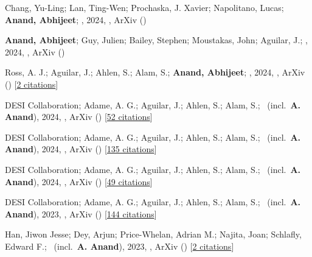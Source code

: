 \item[{\color{numcolor}\scriptsize8}] Chang, Yu-Ling; Lan, Ting-Wen; Prochaska, J. Xavier; Napolitano, Lucas; \textbf{Anand, Abhijeet}; \etal, 2024, , ArXiv ()

\item[{\color{numcolor}\scriptsize7}] \textbf{Anand, Abhijeet}; Guy, Julien; Bailey, Stephen; Moustakas, John; Aguilar, J.; \etal, 2024, , ArXiv ()

\item[{\color{numcolor}\scriptsize6}] Ross, A. J.; Aguilar, J.; Ahlen, S.; Alam, S.; \textbf{Anand, Abhijeet}; \etal, 2024, , ArXiv () [\href{https://ui.adsabs.harvard.edu/abs/2024arXiv240516593R}{2 citations}]

\item[{\color{numcolor}\scriptsize5}] DESI Collaboration; Adame, A. G.; Aguilar, J.; Ahlen, S.; Alam, S.; \etal\ (incl.\ \textbf{A. Anand}), 2024, , ArXiv () [\href{https://ui.adsabs.harvard.edu/abs/2024arXiv240403000D}{52 citations}]

\item[{\color{numcolor}\scriptsize4}] DESI Collaboration; Adame, A. G.; Aguilar, J.; Ahlen, S.; Alam, S.; \etal\ (incl.\ \textbf{A. Anand}), 2024, , ArXiv () [\href{https://ui.adsabs.harvard.edu/abs/2024arXiv240403002D}{135 citations}]

\item[{\color{numcolor}\scriptsize3}] DESI Collaboration; Adame, A. G.; Aguilar, J.; Ahlen, S.; Alam, S.; \etal\ (incl.\ \textbf{A. Anand}), 2024, , ArXiv () [\href{https://ui.adsabs.harvard.edu/abs/2024arXiv240403001D}{49 citations}]

\item[{\color{numcolor}\scriptsize2}] DESI Collaboration; Adame, A. G.; Aguilar, J.; Ahlen, S.; Alam, S.; \etal\ (incl.\ \textbf{A. Anand}), 2023, , ArXiv () [\href{https://ui.adsabs.harvard.edu/abs/2023arXiv230606308D}{144 citations}]

\item[{\color{numcolor}\scriptsize1}] Han, Jiwon Jesse; Dey, Arjun; Price-Whelan, Adrian M.; Najita, Joan; Schlafly, Edward F.; \etal\ (incl.\ \textbf{A. Anand}), 2023, , ArXiv () [\href{https://ui.adsabs.harvard.edu/abs/2023arXiv230611784H}{2 citations}]